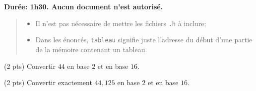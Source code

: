
\def\modulename{pcp}
\RequirePackage[utf8]{course}
\pcp
\newif\ifsolution
\solutionfalse
\usepackage{listings}

\lstset{language=C}

\usepackage{caption}
\usepackage{subcaption}
\usepackage{units}
\usepackage{Cdefs}
\usepackage{tikz}
\usetikzlibrary{arrows}


\def\consigne#1{\null\begin{center}\parbox{13cm}{\large #1}\end{center}\relax}

\def\Question#1#2{\question{}\textbf{(#2)} #1}
\ifsolution
\includecomment{solution}
\else
{}
\fi


\secondesession

\consigne{{\bf Dur{\'e}e: 1h30. Aucun document n'est autorisé.}}

\begin{quotation}
  \em 
  \begin{itemize}
  \item Il n'est pas nécessaire de mettre les fichiers \texttt{.h} à inclure;
  \item Dans les énoncés, \texttt{tableau} signifie juste l'adresse du
    début d'une partie de la mémoire contenant un tableau.
  \end{itemize}
\end{quotation}


\vspace*{1em}


\question (2 pts) Convertir \(44\) en base \(2\) et en base \(16\).

\question (2 pts) Convertir exactement \(44, 125\) en base \(2\) et
en base \(16\).


